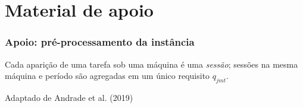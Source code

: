 \documentclass[
	11pt,
	aspectratio=169, %
]{beamer}
\begin{document}

\appendix
\section{Material de apoio}

\begin{frame}
\frametitle{Apoio: pr\'e-processamento da inst\^ancia}

{\small Cada apari\c{c}\~ao de uma tarefa sob uma m\'aquina \'e uma
\emph{sess\~ao}; sess\~oes na mesma m\'aquina e per\'iodo s\~ao agregadas em um
\'unico requisito $q_{jmt}$.}

\smallskip

\begin{center}
\resizebox{0.80\textwidth}{!}{}
\end{center}

\vspace{-0.3em}

\begin{center}
\resizebox{0.80\textwidth}{!}{}
\end{center}

\vspace{0.2em}

{\raggedleft\scriptsize\color{black!55}Adaptado de Andrade et al. (2019)\par}

\end{frame}
\end{document}
